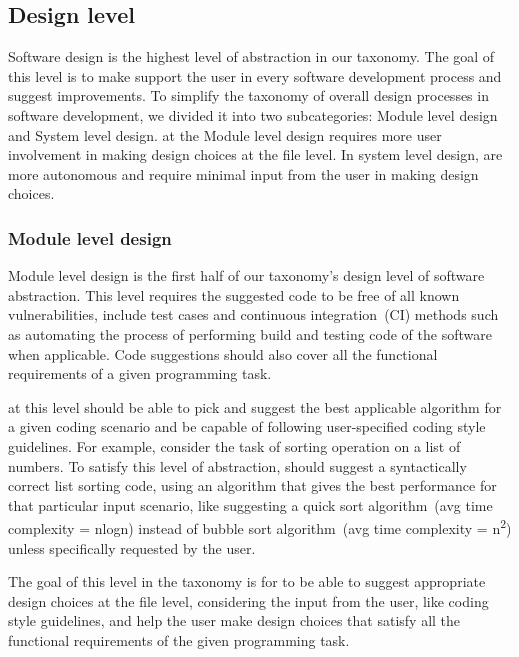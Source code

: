 \subsection{Design level}
Software design is the highest level of abstraction in our taxonomy. The goal of this level is to make \cct{} support the user in every software development process and suggest improvements.
To simplify the taxonomy of overall design processes in software development, we divided it into two subcategories: Module level design and System level design. 
\cct{} at the Module level design requires more user involvement in making design choices at the file level.
In system level design, \cct{} are more autonomous and require minimal input from the user in making design choices.

\subsubsection{Module level design}
\label{low_design}
Module level design is the first half of our taxonomy's design level of software abstraction.
This level requires the suggested code to be free of all known vulnerabilities, include test cases and continuous integration~(CI) methods such as automating the process of performing build and testing code of the software when applicable. 
Code suggestions should also cover all the functional requirements of a given programming task.

\cct{} at this level should be able to pick and suggest the best applicable algorithm for a given coding scenario and be capable of following user-specified coding style guidelines.
For example, consider the task of sorting operation on a list of numbers. To satisfy this level of abstraction, \cct{} should suggest a syntactically correct list sorting code, using an algorithm that gives the best performance for that particular input scenario, like suggesting a quick sort algorithm~(avg time complexity = nlogn) instead of bubble sort algorithm~(avg time complexity = n\textsuperscript{2}) unless specifically requested by the user.

The goal of this level in the taxonomy is for \cct{} to be able to suggest appropriate design choices at the file level, considering the input from the user, like coding style guidelines, and help the user make design choices that satisfy all the functional requirements of the given programming task.

